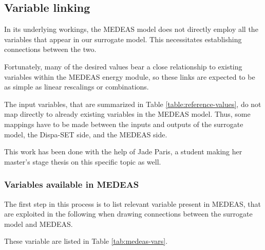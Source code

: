 \subsection{Variable linking}

In its underlying workings, the MEDEAS model does not directly employ all the variables that appear in our surrogate model. This necessitates establishing connections between the two.

Fortunately, many of the desired values bear a close relationship to existing variables within the MEDEAS energy module, so these links are expected to be as simple as linear rescalings or combinations.

The input variables, that are summarized in Table \ref{table:reference-values}, do not map directly to already existing variables in the MEDEAS model. Thus, some mappings have to be made between the inputs and outputs of the surrogate model, the Dispa-SET side, and the MEDEAS side.

This work has been done with the help of Jade Paris, a student making her master's stage thesis on this specific topic as well.

\subsubsection{Variables available in MEDEAS}

The first step in this process is to list relevant variable present in MEDEAS, that are exploited in the following when drawing connections between the surrogate model and MEDEAS.

These variable are listed in Table \ref{tab:medeas-vars}.

